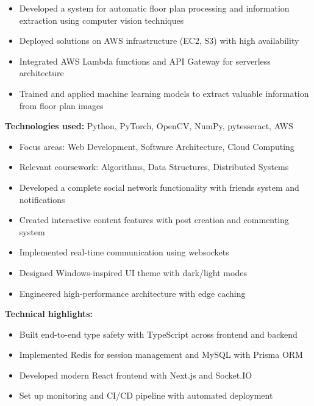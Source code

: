 \documentclass[10pt,a4paper,ragged2e,withhyper]{altacv}
\begin{document}
\makeheader{}

\begin{paracol}{2}
\begin{leftcolumn}
\begin{itemize}
\item Developed a system for automatic floor plan processing and information extraction using computer vision techniques
\item Deployed solutions on AWS infrastructure (EC2, S3) with high availability
\item Integrated AWS Lambda functions and API Gateway for serverless architecture
\item Trained and applied machine learning models to extract valuable information from floor plan images
\end{itemize}
\textbf{Technologies used:} Python, PyTorch, OpenCV, NumPy, pytesseract, AWS

\divider

\begin{itemize}
\item Focus areas: Web Development, Software Architecture, Cloud Computing
\item Relevant coursework: Algorithms, Data Structures, Distributed Systems
\end{itemize}

\divider

\begin{itemize}
\item Developed a complete social network functionality with friends system and notifications
\item Created interactive content features with post creation and commenting system
\item Implemented real-time communication using websockets
\item Designed Windows-inspired UI theme with dark/light modes
\item Engineered high-performance architecture with edge caching
\end{itemize}

\textbf{Technical highlights:}
\begin{itemize}
\item Built end-to-end type safety with TypeScript across frontend and backend
\item Implemented Redis for session management and MySQL with Prisma ORM
\item Developed modern React frontend with Next.js and Socket.IO
\item Set up monitoring and CI/CD pipeline with automated deployment
\end{itemize}


\end{leftcolumn}
\end{paracol}
\end{document}
